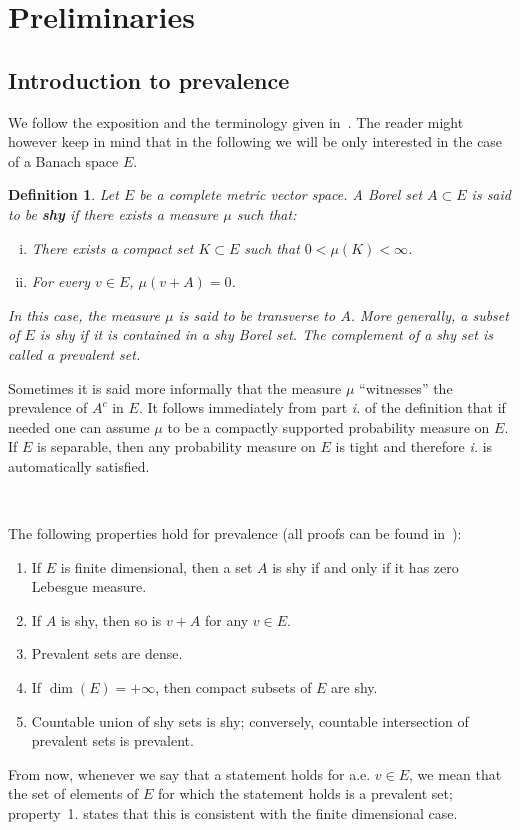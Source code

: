\documentclass[10pt]{article}
\newcommand{\tmtextbf}[1]{{\bfseries{#1}}}
\newcommand{\tmtextit}[1]{{\itshape{#1}}}
\newenvironment{enumeratenumeric}{\begin{enumerate}[1.] }{\end{enumerate}}
\newenvironment{enumerateroman}{\begin{enumerate}[i.] }{\end{enumerate}}
\newtheorem{definition}[theorem]{Definition}
\begin{document}
\section{Preliminaries}\label{sec2}

\subsection{Introduction to prevalence}\label{sec2.1}

We follow the exposition and the terminology given in~{\cite{huntsauer}}. The
reader might however keep in mind that in the following we will be only
interested in the case of a Banach space $E$.

\begin{definition}
  \label{definition prevalence}Let $E$ be a complete metric vector space. A
  Borel set $A \subset E$ is said to be \tmtextbf{shy} if there exists a
  measure $\mu$ such that:
  \begin{enumerateroman}
    \item There exists a compact set $K \subset E$ such that $0 < \mu (K) <
    \infty$.
    
    \item For every $v \in E$, $\mu (v + A) = 0$.
  \end{enumerateroman}
  In this case, the measure $\mu$ is said to be transverse to $A$. More
  generally, a subset of $E$ is shy if it is contained in a shy Borel set. The
  complement of a shy set is called a prevalent set.
\end{definition}

Sometimes it is said more informally that the measure $\mu$ ``witnesses'' the
prevalence of $A^c$ in $E$. It follows immediately from part \tmtextit{i.} of
the definition that if needed one can assume $\mu$ to be a compactly supported
probability measure on $E$. If $E$ is separable, then any probability measure
on $E$ is tight and therefore \tmtextit{i.} is automatically satisfied.

\

The following properties hold for prevalence (all proofs can be found
in~{\cite{huntsauer}}):
\begin{enumeratenumeric}
  \item If $E$ is finite dimensional, then a set $A$ is shy if and only if it
  has zero Lebesgue measure.
  
  \item If $A$ is shy, then so is $v + A$ for any $v \in E$.
  
  \item Prevalent sets are dense.
  
  \item If $\dim (E) = + \infty$, then compact subsets of $E$ are shy.
  
  \item Countable union of shy sets is shy; conversely, countable intersection
  of prevalent sets is prevalent. 
\end{enumeratenumeric}
From now, whenever we say that a statement holds for a.e. $v \in E$, we mean
that the set of elements of $E$ for which the statement holds is a prevalent
set; property~1. states that this is consistent with the finite dimensional
case.
\end{document}
